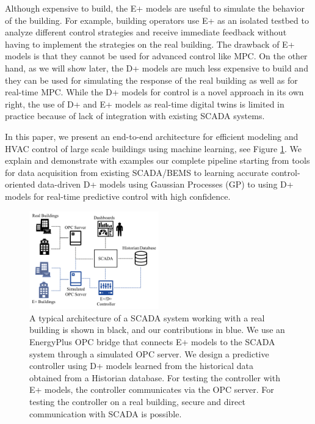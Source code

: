 Although expensive to build, the E+ models are useful to simulate the behavior of the building. For example, building operators use E+ as an isolated testbed to analyze different control strategies and receive immediate feedback without having to implement the strategies on the real building.
The drawback of E+ models is that they cannot be used for advanced control like MPC.
On the other hand, as we will show later, %
the D+ models are much less expensive to build and they can be used for simulating the response of the real building as well as for real-time MPC.
While the D+ models for control is a novel approach in its own right, the use of D+ and E+ models as real-time digital twins is limited in practice because of lack of integration with existing SCADA systems.

In this paper, we present an end-to-end architecture for efficient modeling and HVAC control of large scale buildings using machine learning, see Figure \ref{F:intro}. 
We explain and demonstrate with examples our complete pipeline starting from tools for data acquisition from existing SCADA/BEMS to learning accurate control-oriented data-driven D+ models using Gaussian Processes (GP) to using D+ models for real-time predictive control with high confidence.

\begin{figure}[t]
  \includegraphics[width=0.5\textwidth]{images/overview.png}
  \caption{A typical architecture of a SCADA system working with a real building is shown in black, and our contributions in blue. We use an EnergyPlus OPC bridge that connects E+ models to the SCADA system through a simulated OPC server. We design a predictive controller using D+ models learned from the historical data obtained from a Historian database. For testing the controller with E+ models, the controller communicates via the OPC server. For testing the controller on a real building, secure and direct communication with SCADA is possible.}
  \label{F:intro}
\end{figure}

